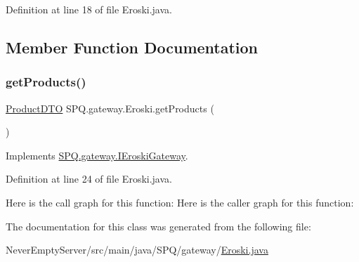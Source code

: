 Definition at line 18 of file Eroski.\+java.



\subsection{Member Function Documentation}
\mbox{\label{class_s_p_q_1_1gateway_1_1_eroski_acfd174565206c16fb55489786957b8de}} 
\subsubsection{\texorpdfstring{get\+Products()}{getProducts()}}
{\footnotesize\ttfamily \mbox{\hyperlink{class_s_p_q_1_1dto_1_1_product_d_t_o}{Product\+D\+TO}} S\+P\+Q.\+gateway.\+Eroski.\+get\+Products (\begin{DoxyParamCaption}{ }\end{DoxyParamCaption})}



Implements \mbox{\hyperlink{interface_s_p_q_1_1gateway_1_1_i_eroski_gateway_a6263f66378bc39296c6ea003642d79b9}{S\+P\+Q.\+gateway.\+I\+Eroski\+Gateway}}.



Definition at line 24 of file Eroski.\+java.

Here is the call graph for this function\+:
Here is the caller graph for this function\+:


The documentation for this class was generated from the following file\+:\begin{DoxyCompactItemize}
\item 
Never\+Empty\+Server/src/main/java/\+S\+P\+Q/gateway/\mbox{\hyperlink{_eroski_8java}{Eroski.\+java}}\end{DoxyCompactItemize}
